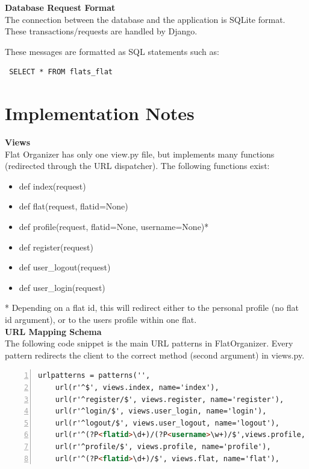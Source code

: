 \documentclass{sig-alt-release2}
\begin{document}
\vspace{5 mm}
\noindent
\textbf{Database Request Format} \\
The connection between the database and the application is SQLite format. These transactions/requests are handled by Django.

These messages are formatted as SQL statements such as: 
\begin{verbatim} SELECT * FROM flats_flat \end{verbatim}


\section{Implementation Notes}

\noindent \textbf{Views}\\
Flat Organizer has only one view.py file, but implements many functions (redirected through the URL dispatcher). The following functions exist:

\begin{itemize}
\item def index(request)
\item def flat(request, flatid=None)
\item def profile(request, flatid=None, username=None)*
\item def register(request)
\item def user{\_}logout(request)
\item def user{\_}login(request)
\end{itemize}
* Depending on a flat id, this will redirect either to the personal profile (no flat id argument), or to the users profile within one flat. \\

\noindent \textbf{URL Mapping Schema}\\
The following code snippet is the main URL patterns in FlatOrganizer. Every pattern redirects the client to the correct method (second argument) in views.py.

\begin{lstlisting}[language=HTML, numbers=left, linewidth=8.5cm, breaklines=true, breakautoindent=true]
urlpatterns = patterns('',
	url(r'^$', views.index, name='index'),
	url(r'^register/$', views.register, name='register'),
	url(r'^login/$', views.user_login, name='login'),
	url(r'^logout/$', views.user_logout, name='logout'),
    url(r'^(?P<flatid>\d+)/(?P<username>\w+)/$',views.profile, name='flatuser'),
	url(r'^profile/$', views.profile, name='profile'),
   	url(r'^(?P<flatid>\d+)/$', views.flat, name='flat'),
\end{lstlisting}
\end{document}
